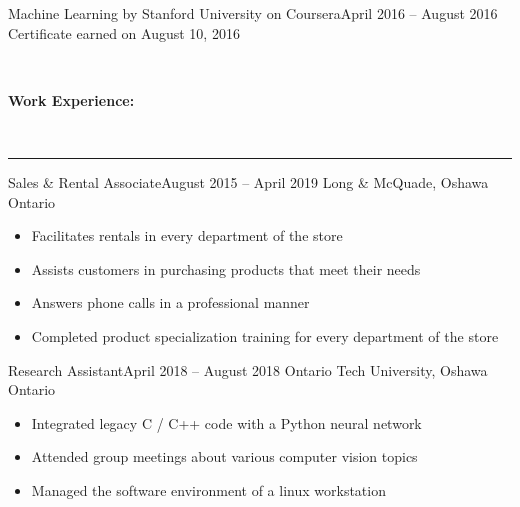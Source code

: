 \documentclass[]{article}
\makeatletter
\newcommand{\heading}[1]
{\begin{large}\textbf{#1}\end{large}\\%
 \rule[1.2ex]{\linewidth}{0.4pt}}
\newenvironment{*subsection}[2]
{
\begin{tabu} to \linewidth {@{}X[l] r}
  \textbf{#1} &
  \textbf{#2}
\end{tabu}
}
{
  \vspace{3mm}
}
\makeatother
\begin{document}
\begin{*subsection}{Machine Learning by Stanford University on Coursera}{April 2016 -- August 2016}%
  Certificate earned on August 10, 2016
\end{*subsection}
\\
\heading{Work Experience:}
\begin{*subsection}{Sales \& Rental Associate}{August 2015 -- April 2019}
  Long \& McQuade, Oshawa Ontario
  \begin{itemize}
    \item Facilitates rentals in every department of the store
    \item Assists customers in purchasing products that meet their needs
    \item Answers phone calls in a professional manner
    \item Completed product specialization training for every department of the store
  \end{itemize}
\end{*subsection}
%
\begin{*subsection}{Research Assistant}{April 2018 -- August 2018}
  Ontario Tech University, Oshawa Ontario
  \begin{itemize}
    \item Integrated legacy C / C++ code with a Python neural network
    \item Attended group meetings about various computer vision topics
    \item Managed the software environment of a linux workstation
  \end{itemize}
\end{*subsection}
%
\end{document}
